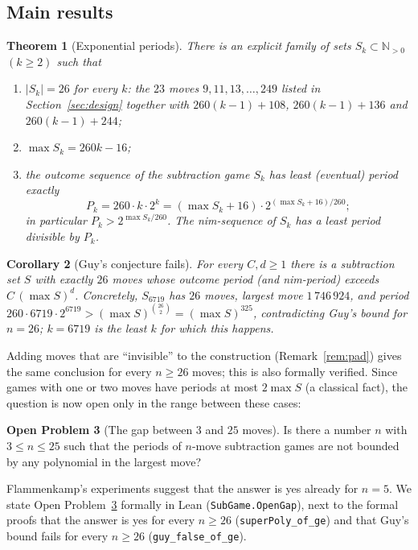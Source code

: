 \documentclass[11pt]{article}
\newtheorem{theorem}{Theorem}
\newtheorem{corollary}[theorem]{Corollary}
\theoremstyle{definition}
\newtheorem{openproblem}[theorem]{Open Problem}
\newcommand{\N}{\mathbb{N}}
\newcommand{\nmoves}{26}
\begin{document}
\subsection{Main results}

\begin{theorem}[Exponential periods]\label{thm:main}
There is an explicit family of sets $S_k\subset\N_{>0}$ $(k\ge 2)$ such that
\begin{enumerate}[label=(\roman*)]
\item $|S_k|=\nmoves$ for every $k$: the $23$ moves $9,11,13,\dots,249$ listed in Section~\ref{sec:design}
together with $260(k-1)+108$, $260(k-1)+136$ and $260(k-1)+244$;
\item $\max S_k=260k-16$;
\item the outcome sequence of the subtraction game $S_k$ has least (eventual) period exactly
\[P_k=260\cdot k\cdot 2^{k}=(\max S_k+16)\cdot 2^{(\max S_k+16)/260};\]
in particular $P_k> 2^{\max S_k/260}$.  The nim-sequence of $S_k$ has a least period divisible by
$P_k$.
\end{enumerate}
\end{theorem}

\begin{corollary}[Guy's conjecture fails]\label{cor:guy}
For every $C,d\ge 1$ there is a subtraction set $S$ with exactly $\nmoves$ moves whose outcome period
(and nim-period) exceeds $C\,(\max S)^d$.  Concretely, $S_{6719}$ has $\nmoves$ moves, largest move
$1\,746\,924$, and period $260\cdot 6719\cdot 2^{6719}>(\max S)^{\binom{26}{2}}=(\max S)^{325}$,
contradicting Guy's bound for $n=\nmoves$; $k=6719$ is the least $k$ for which this happens.
\end{corollary}

Adding moves that are ``invisible'' to the construction (Remark~\ref{rem:pad}) gives the same
conclusion for every $n\ge\nmoves$ moves; this is also formally verified.  Since games with one or two
moves have periods at most $2\max S$ (a classical fact), the question is now open only in the range
between these cases:

\begin{openproblem}[The gap between $3$ and $25$ moves]\label{op:gap}
Is there a number $n$ with $3\le n\le 25$ such that the periods of $n$-move subtraction games are not
bounded by any polynomial in the largest move?
\end{openproblem}

Flammenkamp's experiments suggest that the answer is yes already for $n=5$.  We state
Open Problem~\ref{op:gap} formally in Lean (\texttt{SubGame.OpenGap}), next to the formal proofs that
the answer is yes for every $n\ge26$ (\texttt{superPoly\_of\_ge}) and that Guy's bound fails for every
$n\ge26$ (\texttt{guy\_false\_of\_ge}).
\end{document}
